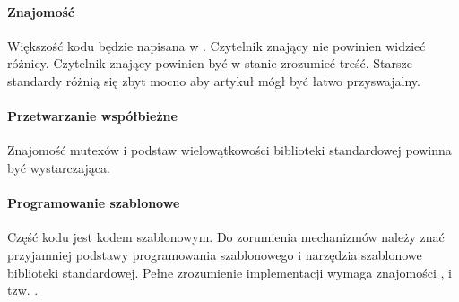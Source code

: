 \paragraph{Znajomość }
Większość kodu będzie napisana w . Czytelnik znający  nie powinien widzieć różnicy. Czytelnik znający  powinien być w stanie zrozumieć treść. Starsze standardy różnią się zbyt mocno aby artykuł mógł być łatwo przyswajalny.

\paragraph{Przetwarzanie współbieżne}
Znajomość mutexów i podstaw wielowątkowości biblioteki standardowej \Cpp{} powinna być wystarczająca.

\paragraph{Programowanie szablonowe}
Część kodu jest kodem szablonowym. Do zorumienia mechanizmów należy znać przyjamniej podstawy programowania szablonowego i narzędzia szablonowe biblioteki standardowej. Pełne zrozumienie implementacji wymaga znajomości , i tzw. .
